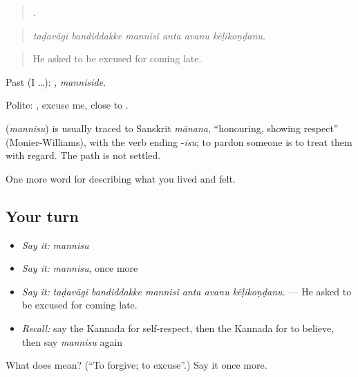 \begin{quote}
     .
\end{quote}

\begin{quote}
\emph{taḍavāgi bandiddakke mannisi anta avanu kēḷikoṇḍanu.}
\end{quote}

\begin{quote}
He asked to be excused for coming late.
\end{quote}

Past (I …): , \emph{manniside}.

Polite: , excuse me, close to .

\begin{cousinweb}
\textbf{} (\emph{mannisu}) is usually traced to Sanskrit \emph{mānana}, \textquotedblleft{}honouring, showing respect\textquotedblright{} (Monier-Williams), with the verb ending -\emph{isu}; to pardon someone is to treat them with regard. The path is not settled.
\end{cousinweb}

\begin{grammarlens}[title={What you've built}]
One more word for describing what you lived and felt.
\end{grammarlens}

\subsection*{Your turn}
\begin{itemize}
\raggedright
  \item \emph{Say it:} \emph{mannisu}
  \item \emph{Say it:} \emph{mannisu}, once more
  \item \emph{Say it:} \emph{taḍavāgi bandiddakke mannisi anta avanu kēḷikoṇḍanu.} — He asked to be excused for coming late.
  \item \emph{Recall:} say the Kannada for self-respect, then the Kannada for to believe, then say \emph{mannisu} again
\end{itemize}

\begin{tcolorbox}[breakable,colback=teal!4,colframe=teal!35!black,title={Before you move on}]
What does  mean? (\textquotedblleft{}To forgive; to excuse\textquotedblright{}.) Say it once more.
\end{tcolorbox}

